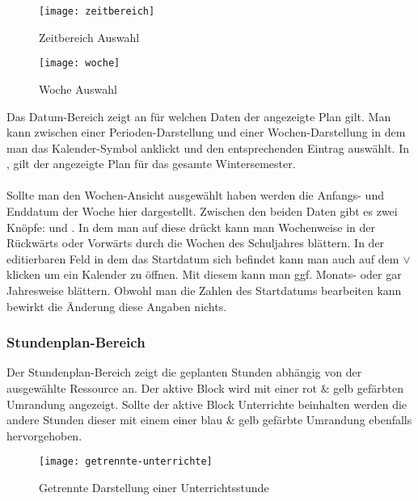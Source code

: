 \begin{wrapfigure}{r}{0.4\textwidth}
	\centering
	\vspace{-14pt}
	\texttt{[image: zeitbereich]}
	\vspace{-5pt}
	\caption{Zeitbereich Auswahl}
	\label{fig:zeitbereich}
	\vspace{14pt}
	\texttt{[image: woche]}
	\vspace{-5pt}
	\caption{Woche Auswahl}
	\label{fig:woche}
\end{wrapfigure}

Das Datum-Bereich zeigt an für welchen Daten der angezeigte Plan gilt. Man kann zwischen einer Perioden-Darstellung und einer Wochen-Darstellung in dem man das Kalender-Symbol anklickt und den entsprechenden Eintrag auswählt. In , gilt der angezeigte Plan für das gesamte Wintersemester.\\
\\
Sollte man den Wochen-Ansicht ausgewählt haben werden die Anfangs- und Enddatum der Woche hier dargestellt. Zwischen den beiden Daten gibt es zwei Knöpfe: \UParrow \hspace{2pt} und \DOWNarrow. In dem man auf diese drückt kann man Wochenweise in der Rückwärts \UParrow \hspace{2pt} oder Vorwärts \DOWNarrow \hspace{2pt} durch die Wochen des Schuljahres blättern. In der editierbaren Feld in dem das Startdatum sich befindet kann man auch auf dem $\vee$ klicken um ein Kalender zu öffnen. Mit diesem kann man ggf. Monats- oder gar Jahresweise blättern. Obwohl man die Zahlen des Startdatums bearbeiten kann bewirkt die Änderung diese Angaben nichts.

\subsubsection{Stundenplan-Bereich}

Der Stundenplan-Bereich zeigt die geplanten Stunden abhängig von der ausgewählte Ressource an. Der aktive Block wird mit einer rot \& gelb gefärbten Umrandung angezeigt. Sollte der aktive Block Unterrichte beinhalten werden die andere Stunden dieser mit einem einer blau \& gelb gefärbte Umrandung ebenfalls hervorgehoben.\\

\begin{wrapfigure}{r}{0.3\textwidth}
	\centering
	\texttt{[image: getrennte-unterrichte]}
	\vspace{-5pt}
	\caption{Getrennte Darstellung einer Unterrichtsstunde}
	\label{fig:getrennte-unterrichte}
\end{wrapfigure}

